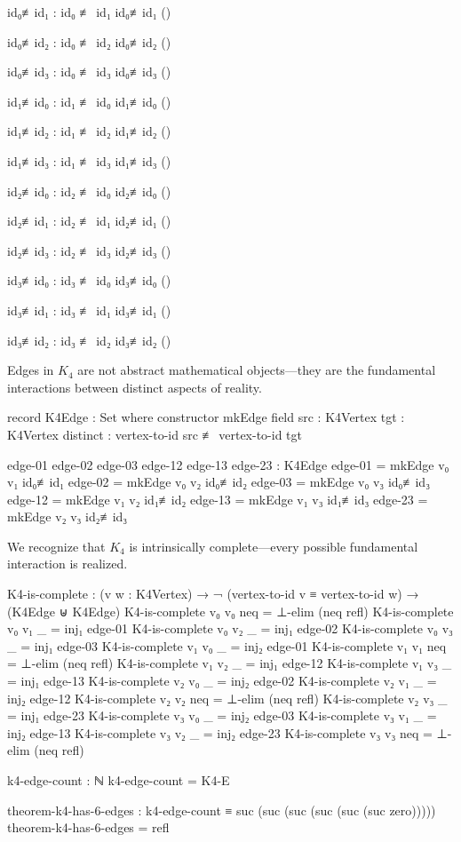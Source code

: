 \documentclass[11pt,a4paper]{book}
\begin{document}
\begin{code}
id₀≢id₁ : id₀ ≢ id₁
id₀≢id₁ ()

id₀≢id₂ : id₀ ≢ id₂
id₀≢id₂ ()

id₀≢id₃ : id₀ ≢ id₃
id₀≢id₃ ()

id₁≢id₀ : id₁ ≢ id₀
id₁≢id₀ ()

id₁≢id₂ : id₁ ≢ id₂
id₁≢id₂ ()

id₁≢id₃ : id₁ ≢ id₃
id₁≢id₃ ()

id₂≢id₀ : id₂ ≢ id₀
id₂≢id₀ ()

id₂≢id₁ : id₂ ≢ id₁
id₂≢id₁ ()

id₂≢id₃ : id₂ ≢ id₃
id₂≢id₃ ()

id₃≢id₀ : id₃ ≢ id₀
id₃≢id₀ ()

id₃≢id₁ : id₃ ≢ id₁
id₃≢id₁ ()

id₃≢id₂ : id₃ ≢ id₂
id₃≢id₂ ()
\end{code}

Edges in $K_4$ are not abstract mathematical objects—they are the fundamental interactions between distinct aspects of reality.

\begin{code}
record K4Edge : Set where
  constructor mkEdge
  field
    src      : K4Vertex
    tgt      : K4Vertex
    distinct : vertex-to-id src ≢ vertex-to-id tgt

edge-01 edge-02 edge-03 edge-12 edge-13 edge-23 : K4Edge
edge-01 = mkEdge v₀ v₁ id₀≢id₁
edge-02 = mkEdge v₀ v₂ id₀≢id₂
edge-03 = mkEdge v₀ v₃ id₀≢id₃
edge-12 = mkEdge v₁ v₂ id₁≢id₂
edge-13 = mkEdge v₁ v₃ id₁≢id₃
edge-23 = mkEdge v₂ v₃ id₂≢id₃

\end{code}

We recognize that $K_4$ is intrinsically complete—every possible fundamental interaction is realized.

\begin{code}
K4-is-complete : (v w : K4Vertex) → ¬ (vertex-to-id v ≡ vertex-to-id w) → 
                 (K4Edge ⊎ K4Edge)
K4-is-complete v₀ v₀ neq = ⊥-elim (neq refl)
K4-is-complete v₀ v₁ _   = inj₁ edge-01
K4-is-complete v₀ v₂ _   = inj₁ edge-02
K4-is-complete v₀ v₃ _   = inj₁ edge-03
K4-is-complete v₁ v₀ _   = inj₂ edge-01
K4-is-complete v₁ v₁ neq = ⊥-elim (neq refl)
K4-is-complete v₁ v₂ _   = inj₁ edge-12
K4-is-complete v₁ v₃ _   = inj₁ edge-13
K4-is-complete v₂ v₀ _   = inj₂ edge-02
K4-is-complete v₂ v₁ _   = inj₂ edge-12
K4-is-complete v₂ v₂ neq = ⊥-elim (neq refl)
K4-is-complete v₂ v₃ _   = inj₁ edge-23
K4-is-complete v₃ v₀ _   = inj₂ edge-03
K4-is-complete v₃ v₁ _   = inj₂ edge-13
K4-is-complete v₃ v₂ _   = inj₂ edge-23
K4-is-complete v₃ v₃ neq = ⊥-elim (neq refl)

k4-edge-count : ℕ
k4-edge-count = K4-E

theorem-k4-has-6-edges : k4-edge-count ≡ suc (suc (suc (suc (suc (suc zero)))))
theorem-k4-has-6-edges = refl

\end{code}
\end{document}
